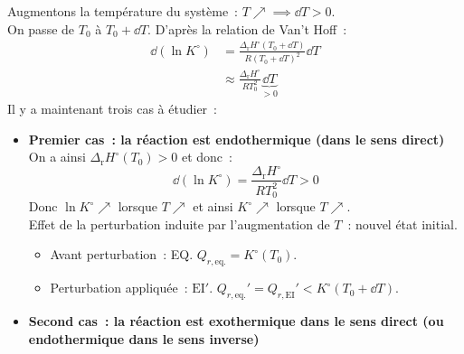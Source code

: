\documentclass{article}
\newcommand{\Dr}{\Delta_{\mathrm{r}}}
\newcommand{\EI}{\mathrm{EI}}
\newcommand{\equi}{\text{eq.}}
\begin{document}
\begin{tableau}
    Augmentons la température du système~: $T \nearrow \implies \dd{T}>0$.\\
    On passe de $T_0$ à $T_0+\dd{T}$. D'après la relation de Van't Hoff~:
    \begin{align*}
        \dd(\ln K^\circ) &= \frac{\Dr H^\circ(T_0+\dd{T})}{R(T_0+\dd{T})^2}\dd{T}\\
        &\approx \frac{\Dr H^\circ}{RT_0^2}\underbrace{\dd{T}}_{>0}
    \end{align*}
    Il y a maintenant trois cas à étudier~:
    \begin{itemize}
        \item \textbf{Premier cas~: la réaction est endothermique (dans le sens direct)}\\
        On a ainsi $\Dr H^\circ(T_0) > 0$ et donc~:
        $$\dd(\ln K^\circ) = \frac{\Dr H^\circ}{RT_0^2}\dd{T} >0$$
        Donc $\ln K^\circ \nearrow$ lorsque $T \nearrow$ et ainsi $K^\circ \nearrow$ lorsque $T\nearrow$.\\
        Effet de la perturbation induite par l'augmentation de $T$~: nouvel état initial.
        \begin{itemize}
            \item Avant perturbation~: EQ. $Q_{r,\equi} = K^\circ(T_0)$.
            \item Perturbation appliquée~: $\EI'$. $Q_{r,\equi}'=Q_{r,\EI}'<K^\circ(T_0+\dd{T})$.
        \end{itemize}
        \begin{figure}[H]
            \centering
        \end{figure}
        \item \textbf{Second cas~: la réaction est exothermique dans le sens direct (ou endothermique dans le sens inverse)}\\

\end{itemize}
\end{tableau}
\end{document}
